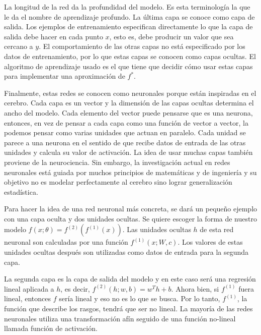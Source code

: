 \vspace{1em}

La longitud de la red da la profundidad del modelo. Es esta terminología la que le da el nombre de aprendizaje profundo. La última capa se conoce como capa de salida. Los ejemplos de entrenamiento especifican directamente lo que la capa de salida debe hacer en cada punto $x$, esto es, debe producir un valor que sea cercano a $y$. El comportamiento de las otras capas no está especificado por los datos de entrenamiento, por lo que estas capas se conocen como capas ocultas. El algoritmo de aprendizaje usado es el que tiene que decidir cómo usar estas capas para implementar una aproximación de $f^*$.

\vspace{1em}

Finalmente, estas redes se conocen como neuronales porque están inspiradas en el cerebro. Cada capa es un vector y la dimensión de las capas ocultas determina el ancho del modelo. Cada elemento del vector puede pensarse que es una neurona, entonces, en vez de pensar a cada capa como una función de vector a vector, la podemos pensar como varias unidades que actuan en paralelo. Cada unidad se parece a una neurona en el sentido de que recibe datos de entrada de las otras unidades y calcula su valor de activación. La idea de usar muchas capas también proviene de la neurociencia. Sin embargo, la investigación actual en redes neuronales está guiada por muchos principios de matemáticas y de ingeniería y su objetivo no es modelar perfectamente al cerebro sino lograr generalización estadística.
\cite{goodfellow-et-al-2016}

\vspace{1em}

Para hacer la idea de una red neuronal más concreta, se dará un pequeño ejemplo con una capa oculta y dos unidades ocultas. Se quiere escoger la forma de nuestro modelo $f(x;\theta) = f^{(2)}(f^{(1)}(x))$. Las unidades ocultas $h$ de esta red neuronal son calculadas por una función $f^{(1)}(x;W,c)$. Los valores de estas unidades ocultas después son utilizadas como datos de entrada para la segunda capa. 

\vspace{1em}

La segunda capa es la capa de salida del modelo y en este caso será una regresión lineal aplicada a $h$, es decir, $f^{(2)}(h;w,b) = w^Th + b$. Ahora bien, si $f^{(1)}$ fuera lineal, entonces $f$ sería lineal y eso no es lo que se busca. Por lo tanto, $f^{(1)}$, la función que describe los rasgos, tendrá que ser no lineal. La mayoría de las redes neuronales utiliza una transformación afín seguido de una función no-lineal llamada función de activación. 
\cite{goodfellow-et-al-2016}

